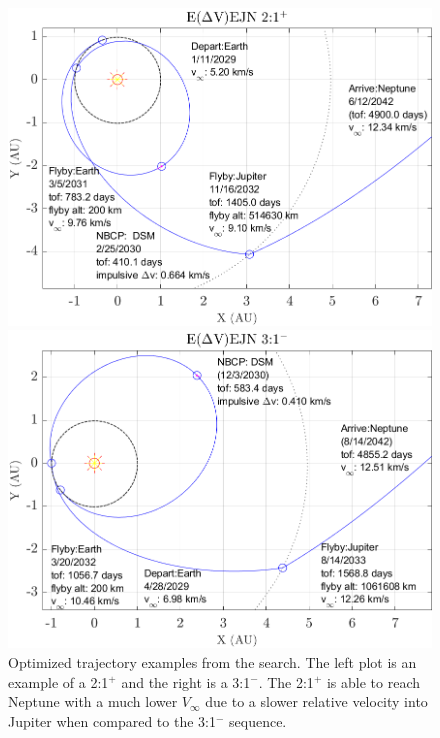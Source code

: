 \documentclass[letterpaper, paper,11pt]{./AAS}		%
\begin{document}
%
\begin{figure}[ht]
		\centering
		\begin{minipage}{0.50\textwidth}
				\centering
				\includegraphics[width=1.0\textwidth]{./Figures/eejn21plus}
    \end{minipage}\hfill
		\begin{minipage}{0.50\textwidth}
				\centering
				\includegraphics[width=1.0\textwidth]{./Figures/eejn31minus}
		\end{minipage}
		\caption{Optimized trajectory examples from the search. The left plot is an example of a 2:1$^{+}$ and the right is a 3:1$^{-}$. The 2:1$^{+}$ is able to reach Neptune with a much lower $V_\infty$ due to a slower relative velocity into Jupiter when compared to the 3:1$^{-}$ sequence.}
		\label{fig:maltotriton}
\end{figure}
%
%
\end{document}
